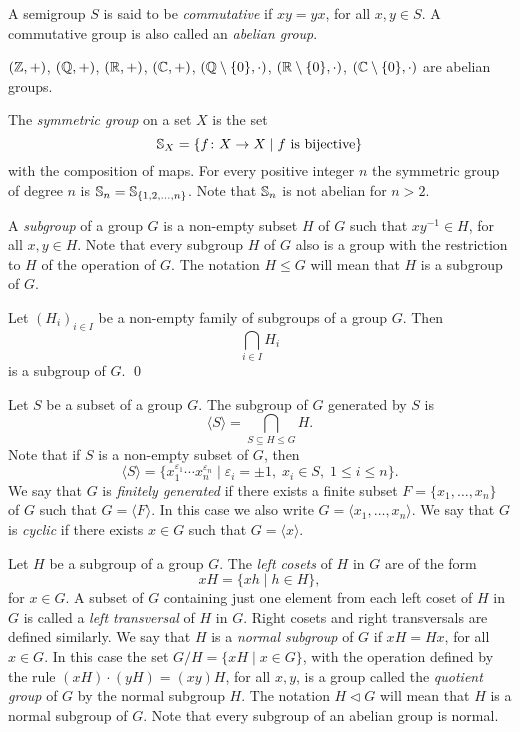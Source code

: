 A semigroup $S$ is said to be {\em commutative} if $xy=yx$, for all $x,y\in S$. A commutative group is also called an {\em abelian group}.

\begin{example}
 $(\mathbb{Z}, +)$,  $(\mathbb{Q}, +)$, $(\mathbb{R}, +)$, $(\mathbb{C}, +)$, $(\mathbb{Q}\setminus\{0\}, \cdot)$, $(\mathbb{R}\setminus\{0\}, \cdot)$, 
	$(\mathbb{C}\setminus\{0\}, \cdot)$ are abelian groups.
\end{example}

\begin{example}
	The {\em symmetric group} on a set $X$ is the set 
$$\mathbb{S}_X=\{ f\colon X\rightarrow X\mid f \mbox{ is bijective}\}$$
with the composition of maps. For every positive integer $n$ the symmetric group of degree $n$ is
$\mathbb{S}_n=\mathbb{S}_{\{ 1,2,\dots ,n\}}$. Note that $\mathbb{S}_n$ is not abelian for $n>2$.
\end{example}    



A {\em subgroup} of a group $G$ is a non-empty subset $H$ of $G$ such that $xy^{-1}\in H$, for all $x,y\in H$. Note that every subgroup $H$ of $G$ also is a group with the restriction to $H$ of the operation of $G$. The notation $H\leq G$ will mean that $H$ is a subgroup of $G$.

\begin{proposition}\label{intersection}
	Let $(H_i)_{i\in I}$ be a non-empty family of subgroups of a group $G$. Then 
	\[ \bigcap_{i\in I}H_i \]
    is a subgroup of $G$. \qed
	\end{proposition}   

Let $S$ be a subset of a group $G$. The subgroup of $G$ generated by $S$ is
$$\langle S\rangle=\bigcap_{S\subseteq H\leq G}H.$$
Note that if $S$ is a non-empty subset of $G$, then
$$\langle S\rangle=\{ x_1^{\varepsilon_1}\cdots x_n^{\varepsilon_n}\mid \varepsilon_i=\pm 1,\; x_i\in S,\; 1\leq i\leq n \}.$$
We say that $G$ is {\em finitely generated} if there exists a finite subset $F=\{ x_1,\dots ,x_n\}$ of $G$ such that $G=\langle F\rangle$. In this case we also write $G=\langle x_1,\dots ,x_n\rangle$. We say that $G$ is {\em cyclic} if there exists $x\in G$ such that $G=\langle x\rangle$. 

Let $H$ be a subgroup of a group $G$. The {\em left cosets} of $H$ in $G$ are of the form
$$xH=\{ xh\mid h\in H\},$$
for $x\in G$. A subset of $G$ containing just one element from each left coset of $H$ in $G$ is called a {\em left transversal} of $H$ in $G$. Right cosets and right transversals are defined similarly.
We say that $H$ is a {\em normal subgroup} of $G$ if $xH=Hx$, for all $x\in G$. In this case the set
$G/H=\{xH\mid x\in G\}$, with the operation defined by the rule $(xH)\cdot (yH)=(xy)H$, for all $x,y$, is a group called the {\em quotient group} of $G$ by the normal subgroup $H$. The notation $H\lhd G$ will mean that $H$ is a normal subgroup of $G$. Note that every subgroup of an abelian group is normal.


